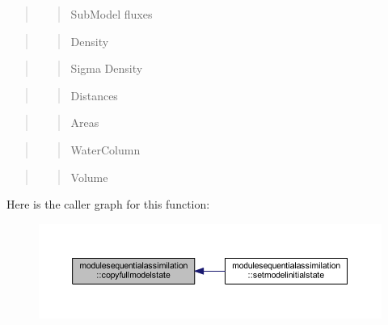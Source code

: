 \begin{quote}
\begin{quote}
Sub\+Model fluxes \end{quote}
\end{quote}


\begin{quote}
\begin{quote}
Density \end{quote}
\end{quote}


\begin{quote}
\begin{quote}
Sigma Density \end{quote}
\end{quote}


\begin{quote}
\begin{quote}
Distances \end{quote}
\end{quote}


\begin{quote}
\begin{quote}
Areas \end{quote}
\end{quote}


\begin{quote}
\begin{quote}
Water\+Column \end{quote}
\end{quote}


\begin{quote}
\begin{quote}
Volume \end{quote}
\end{quote}
Here is the caller graph for this function\+:\nopagebreak
\begin{figure}[H]
\begin{center}
\leavevmode
\includegraphics[width=350pt]{namespacemodulesequentialassimilation_a19283cb361ee6cdaa626fd20bad85d11_icgraph}
\end{center}
\end{figure}
\mbox{\label{namespacemodulesequentialassimilation_adcd2e5938f9991a133ebe1cf7eb7ad2f}} 
